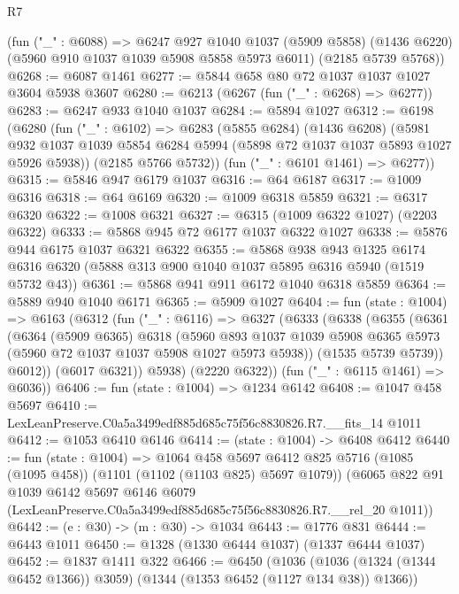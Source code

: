 \begin{lexlean}{R7}
\begin{coremodule}
    (fun ("_" : @6088) =>
    @6247
      @927
      @1040
      @1037
      (@5909 @5858)
      (@1436 @6220)
      (@5960 @910 @1037 @1039 @5908 @5858 @5973 @6011)
      (@2185 @5739 @5768))
@6268 := @6087 @1461
@6277 := @5844 @658 @80 @72 @1037 @1037 @1027 @3604 @5938 @3607
@6280 := @6213 (@6267 (fun ("_" : @6268) => @6277))
@6283 := @6247 @933 @1040 @1037
@6284 := @5894 @1027
@6312 := @6198
    (@6280
      (fun ("_" : @6102) =>
      @6283
        (@5855 @6284)
        (@1436 @6208)
        (@5981 @932 @1037 @1039 @5854 @6284 @5994 (@5898 @72 @1037 @1037 @5893 @1027 @5926 @5938))
        (@2185 @5766 @5732))
      (fun ("_" : @6101 @1461) => @6277))
@6315 := @5846 @947 @6179 @1037
@6316 := @64 @6187
@6317 := @1009 @6316
@6318 := @64 @6169
@6320 := @1009 @6318 @5859
@6321 := @6317 @6320
@6322 := @1008 @6321
@6327 := @6315 (@1009 @6322 @1027) (@2203 @6322)
@6333 := @5868 @945 @72 @6177 @1037 @6322 @1027
@6338 := @5876 @944 @6175 @1037 @6321 @6322
@6355 := @5868
    @938
    @943
    @1325
    @6174
    @6316
    @6320
    (@5888 @313 @900 @1040 @1037 @5895 @6316 @5940 (@1519 @5732 @43))
@6361 := @5868 @941 @911 @6172 @1040 @6318 @5859
@6364 := @5889 @940 @1040 @6171
@6365 := @5909 @1027
@6404 := fun (state : @1004) =>
  @6163
    (@6312
      (fun ("_" : @6116) =>
      @6327
        (@6333
          (@6338
            (@6355
              (@6361
                (@6364
                  (@5909 @6365)
                  @6318
                  (@5960
                    @893
                    @1037
                    @1039
                    @5908
                    @6365
                    @5973
                    (@5960 @72 @1037 @1037 @5908 @1027 @5973 @5938))
                  (@1535 @5739 @5739))
                @6012))
            (@6017 @6321))
          @5938)
        (@2220 @6322))
      (fun ("_" : @6115 @1461) => @6036))
@6406 := fun (state : @1004) => @1234 @6142
@6408 := @1047 @458 @5697
@6410 := LexLeanPreserve.C0a5a3499edf885d685c75f56c8830826.R7.__fits_14 @1011
@6412 := @1053 @6410 @6146
@6414 := (state : @1004) -> @6408 @6412
@6440 := fun (state : @1004) =>
  @1064
    @458
    @5697
    @6412
    @825
    @5716
    (@1085 (@1095 @458))
    (@1101 (@1102 (@1103 @825) @5697 @1079))
    (@6065
      @822
      @91
      @1039
      @6142
      @5697
      @6146
      @6079
      (LexLeanPreserve.C0a5a3499edf885d685c75f56c8830826.R7.__rel_20 @1011))
@6442 := (e : @30) -> (m : @30) -> @1034
@6443 := @1776 @831
@6444 := @6443 @1011
@6450 := @1328 (@1330 @6444 @1037) (@1337 @6444 @1037)
@6452 := @1837 @1411 @322
@6466 := @6450
    (@1036 (@1036 (@1324 (@1344 @6452 @1366)) @3059) (@1344 (@1353 @6452 (@1127 @134 @38)) @1366))

\end{coremodule}
\end{lexlean}
